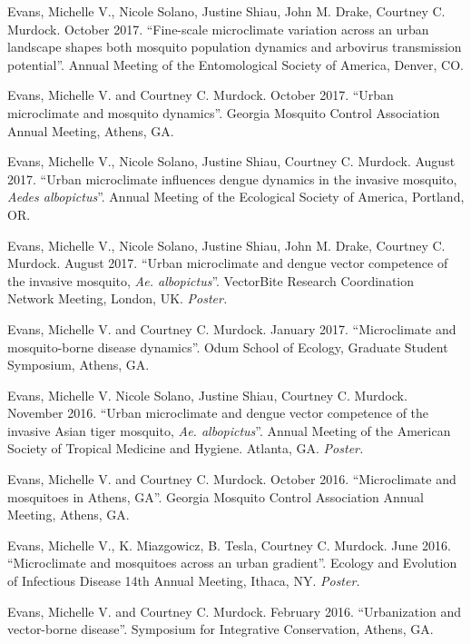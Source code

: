 \begin{cvitems}
	\item Evans, Michelle V., Nicole Solano, Justine Shiau, John M. Drake, Courtney C. Murdock. October 2017. ``Fine-scale microclimate variation across an urban landscape shapes both mosquito population dynamics and arbovirus transmission potential''. Annual Meeting of the Entomological Society of America, Denver, CO.

	\item Evans, Michelle V. and Courtney C. Murdock. October 2017. ``Urban microclimate and mosquito dynamics''. Georgia Mosquito Control Association Annual Meeting, Athens, GA.

	\item Evans, Michelle V., Nicole Solano, Justine Shiau, Courtney C. Murdock. August 2017. ``Urban microclimate influences dengue dynamics in the invasive mosquito, \textit{Aedes albopictus}''. Annual Meeting of the Ecological Society of America, Portland, OR.

	\item Evans, Michelle V., Nicole Solano, Justine Shiau, John M. Drake, Courtney C. Murdock. August 2017. ``Urban microclimate and dengue vector competence of the invasive mosquito, \textit{Ae. albopictus}''. VectorBite Research Coordination Network Meeting, London, UK. \textit{Poster.}

	\item Evans, Michelle V. and Courtney C. Murdock. January 2017. ``Microclimate and mosquito-borne disease dynamics''. Odum School of Ecology, Graduate Student Symposium, Athens, GA.

	\item Evans, Michelle V. Nicole Solano, Justine Shiau, Courtney C. Murdock. November 2016. ``Urban microclimate and dengue vector competence of the invasive Asian tiger mosquito, \textit{Ae. albopictus}''. Annual Meeting of the American Society of Tropical Medicine and Hygiene. Atlanta, GA. \textit{Poster.}

	\item Evans, Michelle V. and Courtney C. Murdock. October 2016. ``Microclimate and mosquitoes in Athens, GA''. Georgia Mosquito Control Association Annual Meeting, Athens, GA.

	\item Evans, Michelle V., K. Miazgowicz, B. Tesla, Courtney C. Murdock. June 2016. ``Microclimate and mosquitoes across an urban gradient''. Ecology and Evolution of Infectious Disease 14th Annual Meeting, Ithaca, NY. \textit{Poster.}

	\item Evans, Michelle V. and Courtney C. Murdock. February 2016. ``Urbanization and vector-borne disease''. Symposium for Integrative Conservation, Athens, GA.


\end{cvitems}
